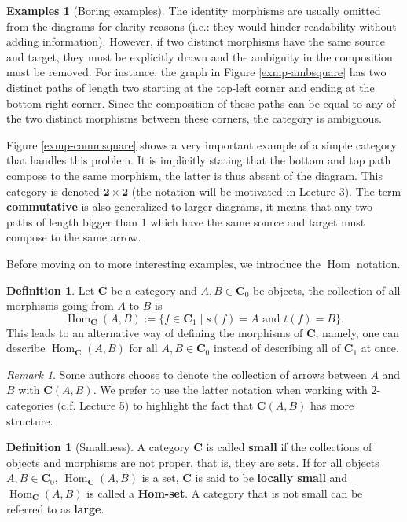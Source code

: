 \documentclass{article}
\theoremstyle{definition}
\newtheorem{defn}[thm]{Definition}
\newtheorem{exmps}[thm]{Examples}
\theoremstyle{remark}
\newtheorem{rem}[thm]{Remark}
\DeclareMathOperator{\Hom}{Hom}
\begin{document}
\begin{exmps}[Boring examples]
	The identity morphisms are usually omitted from the diagrams for clarity reasons (i.e.: they would hinder readability without adding information). However, if two distinct morphisms have the same source and target, they must be explicitly drawn and the ambiguity in the composition must be removed. For instance, the graph in Figure \ref{exmp-ambsquare} has two distinct paths of length two starting at the top-left corner and ending at the bottom-right corner. Since the composition of these paths can be equal to any of the two distinct morphisms between these corners, the category is ambiguous.
	
	Figure \ref{exmp-commsquare} shows a very important example of a simple category that handles this problem. It is implicitly stating that the bottom and top path compose to the same morphism, the latter is thus absent of the diagram. This category is denoted $\mathbf{2} \times \mathbf{2}$ (the notation will be motivated in Lecture 3). The term \textbf{commutative} is also generalized to larger diagrams, it means that any two paths of length bigger than 1 which have the same source and target must compose to the same arrow.
\end{exmps}
Before moving on to more interesting examples, we introduce the $\Hom$ notation.
\begin{defn}
	Let $\mathbf{C}$ be a category and $A,B \in \mathbf{C}_0$ be objects, the collection of all morphisms going from $A$ to $B$ is 
	\[\Hom_{\mathbf{C}}(A,B) := \{f \in \mathbf{C}_1 \mid s(f) = A \text{ and } t(f) = B\}.\]
	This leads to an alternative way of defining the morphisms of $\mathbf{C}$, namely, one can describe $\Hom_{\mathbf{C}}(A,B)$ for all $A, B \in \mathbf{C}_0$ instead of describing all of $\mathbf{C}_1$ at once. 
\end{defn}
\begin{rem}
    Some authors choose to denote the collection of arrows between $A$ and $B$ with $\mathbf{C}(A,B)$. We prefer to use the latter notation when working with $2$-categories (c.f. Lecture 5) to highlight the fact that $\mathbf{C}(A,B)$ has more structure.
\end{rem}
\begin{defn}[Smallness]
	A category $\mathbf{C}$ is called \textbf{small} if the collections of objects and morphisms are not proper, that is, they are sets. If for all objects $A,B \in \mathbf{C}_0$, $\Hom_{\mathbf{C}}(A,B)$ is a set, $\mathbf{C}$ is said to be \textbf{locally small} and $\Hom_{\mathbf{C}}(A,B)$ is called a \textbf{Hom-set}. A category that is not small can be referred to as \textbf{large}.
\end{defn}
\end{document}
